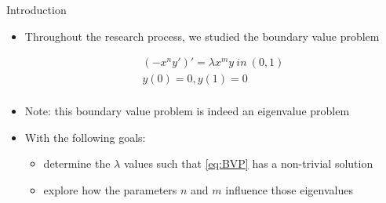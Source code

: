 \documentclass{beamer}
\begin{document}
\begin{frame}{Introduction}

\vspace*{-10mm}

\begin{itemize}

\item Throughout the research process, we studied the boundary value problem

\begin{center}

\begin{minipage}{6cm}

\begin{varblock}[6cm]

\begin{equation}
\begin{array}{l}
\displaystyle (-x^ny')'=\lambda x^my {~} in {~} (0,1)\\[2ex]
\displaystyle y(0)=0, y(1)=0 \\
\end{array} 
\label{eq:BVP}
\end{equation}

\end{varblock}

\end{minipage}

\end{center}

\end{itemize}

\begin{itemize}

\item Note: this boundary value problem is indeed an eigenvalue problem

\item With the following goals:

\begin{itemize}

\item determine the $\lambda$ values such that \eqref{eq:BVP} has a non-trivial solution

\item explore how the parameters $n$ and $m$ influence those eigenvalues

\end{itemize}

\end{itemize}

\end{frame}
\end{document}
